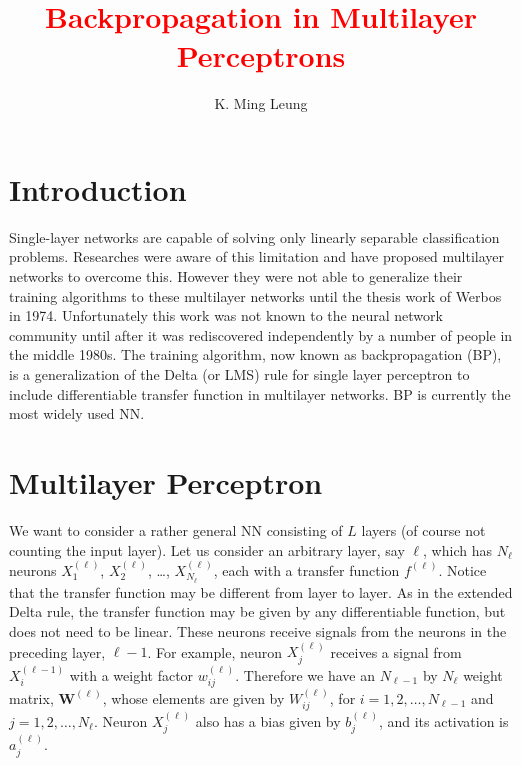 \documentclass[fleqn]{article}
\title{\textcolor{red}{Backpropagation in Multilayer Perceptrons}}
\author{K. Ming Leung}
\begin{document}

\maketitle

\tableofcontents


\section{Introduction}

Single-layer networks are capable of solving only linearly separable classification problems.
Researches were aware of this limitation and have proposed multilayer networks to overcome this.
However they were not able to generalize their training algorithms to these multilayer networks
until the thesis work of Werbos in 1974.
Unfortunately this work was not known to the neural network community until after it was rediscovered
independently by a number of people in the middle 1980s.
The training algorithm, now known as backpropagation (BP), is a generalization of the Delta (or LMS) rule
for single layer perceptron to include differentiable transfer function in multilayer networks.
BP is currently the most widely used NN.


\section{Multilayer Perceptron}

We want to consider a rather general NN consisting of $L$ layers (of course not counting the input layer).
Let us consider an arbitrary layer, say $\ell$, which has $N_\ell$ neurons
$X_1^{(\ell)}$, $X_2^{(\ell)}$, \ldots, $X_{N_\ell}^{(\ell)}$,
each with a transfer function $f^{(\ell)}$.
Notice that the transfer function may be different from layer to layer.
As in the extended Delta rule, the transfer function may be given by
any differentiable function, but does not need to be linear.
These neurons receive signals from the neurons in the preceding layer, $\ell-1$.
For example, neuron $X_j^{(\ell)}$ receives a signal from $X_i^{(\ell-1)}$
with a weight factor $w_{ij}^{(\ell)}$.
Therefore we have an $N_{\ell-1}$ by $N_{\ell}$ weight matrix, $\mathbf W^{(\ell)}$,
whose elements are given by $W_{ij}^{(\ell)}$, for
$i=1, 2, \ldots, N_{\ell-1}$ and $j=1, 2, \ldots, N_{\ell}$.
Neuron $X_j^{(\ell)}$ also has a bias given by $b_j^{(\ell)}$,
and its activation is $ a_j^{(\ell)}$.
\end{document}
